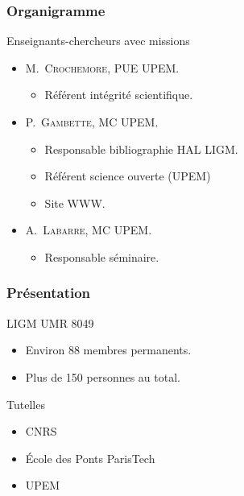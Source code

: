 \documentclass[]{beamer}
\begin{document}
\begin{frame}
  \frametitle{Organigramme}

  \begin{block}{Enseignants-chercheurs avec missions}
    \begin{itemize}
      \item \textsc{M.~Crochemore}, PUE UPEM.
        \begin{itemize}
          \item Référent intégrité scientifique.
        \end{itemize}
      \item \textsc{P.~Gambette}, MC UPEM.
      \begin{itemize}
        \item Responsable bibliographie HAL LIGM.
        \item Référent science ouverte (UPEM)
        \item Site WWW.
      \end{itemize}
      \item \textsc{A.~Labarre}, MC UPEM.
      \begin{itemize}
        \item Responsable séminaire.
      \end{itemize}
    \end{itemize}
  \end{block}

\end{frame}


\begin{frame}
  \frametitle{Présentation}

  \begin{block}{LIGM UMR 8049}
    \begin{itemize}
      \item Environ 88 membres permanents.
      \item Plus de 150 personnes au total.
    \end{itemize}
  \end{block}

  \begin{block}{Tutelles}
    \begin{itemize}
      \item
      CNRS

      \item
      \'Ecole des Ponts ParisTech

      \item
      UPEM
    \end{itemize}
  \end{block}

\end{frame}
\end{document}
